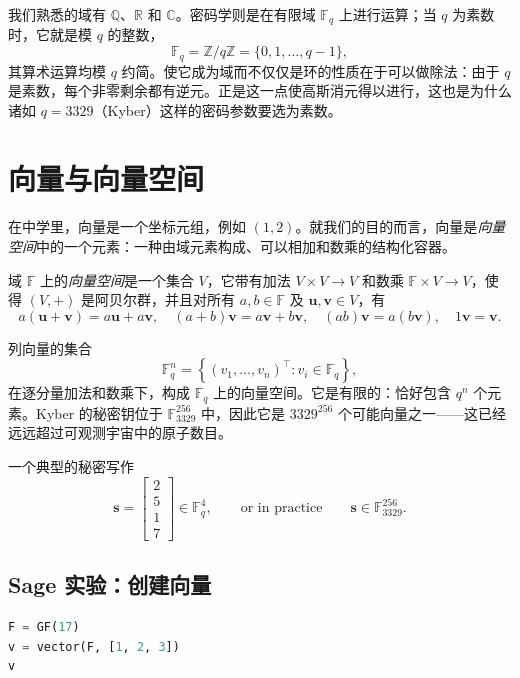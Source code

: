 我们熟悉的域有 $\mathbb{Q}$、$\mathbb{R}$ 和 $\mathbb{C}$。密码学则是在有限域 $\mathbb{F}_q$ 上进行运算；当 $q$ 为素数时，它就是模 $q$ 的整数，
\[
\mathbb{F}_q = \mathbb{Z}/q\mathbb{Z} = \{0,1,\dots,q-1\},
\]
其算术运算均模 $q$ 约简。使它成为域而不仅仅是环的性质在于可以做除法：由于 $q$ 是素数，每个非零剩余都有逆元。正是这一点使高斯消元得以进行，这也是为什么诸如 $q=3329$（Kyber）这样的密码参数要选为素数。

\section{向量与向量空间}
在中学里，向量是一个坐标元组，例如 $(1,2)$。就我们的目的而言，向量是\emph{向量空间}中的一个元素：一种由域元素构成、可以相加和数乘的结构化容器。

\begin{definition}[向量空间]
域 $\mathbb{F}$ 上的\emph{向量空间}是一个集合 $V$，它带有加法 $V\times V\to V$ 和数乘 $\mathbb{F}\times V\to V$，使得 $(V,+)$ 是阿贝尔群，并且对所有 $a,b\in\mathbb{F}$ 及 $\mathbf{u},\mathbf{v}\in V$，有
\[
a(\mathbf{u}+\mathbf{v}) = a\mathbf{u}+a\mathbf{v},\quad
(a+b)\mathbf{v} = a\mathbf{v}+b\mathbf{v},\quad
(ab)\mathbf{v} = a(b\mathbf{v}),\quad
1\mathbf{v} = \mathbf{v}.
\]
\end{definition}

\begin{example}[空间 $\mathbb{F}_q^n$]
列向量的集合
\[
\mathbb{F}_q^n = \left\{ (v_1,\dots,v_n)^\top : v_i \in \mathbb{F}_q \right\},
\]
在逐分量加法和数乘下，构成 $\mathbb{F}_q$ 上的向量空间。它是有限的：恰好包含 $q^n$ 个元素。Kyber 的秘密钥位于 $\mathbb{F}_{3329}^{256}$ 中，因此它是 $3329^{256}$ 个可能向量之一——这已经远远超过可观测宇宙中的原子数目。
\end{example}

一个典型的秘密写作
\[
\mathbf{s} = \begin{bmatrix}2\\5\\1\\7\end{bmatrix} \in \mathbb{F}_{q}^{4},
\qquad\text{or in practice}\qquad
\mathbf{s} \in \mathbb{F}_{3329}^{256}.
\]

\subsection{Sage 实验：创建向量}

\begin{lstlisting}[language=Python]
F = GF(17)
v = vector(F, [1, 2, 3])
v
\end{lstlisting}

